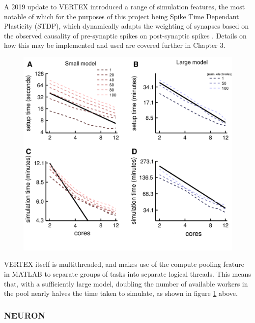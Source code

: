 A 2019 update to VERTEX introduced a range of simulation features, the most
notable of which for the purposes of this project being Spike Time Dependant
Plasticity (STDP), which dynamically adapts the weighting of synapses based on
the observed causality of pre-synaptic spikes on post-synaptic spikes
\autocite{thornton_virtual_2019}. Details on how this may be implemented and
used are covered further in Chapter 3.

\begin{figure}[h]
    \centering
    \includegraphics{figures/graphs/coresVERTEX.png}
     {\cite{tomsett_virtual_2015}}
    \label{VERTEXparallel}
\end{figure}
\vspace{1ex}

VERTEX itself is multithreaded, and makes use of the compute pooling feature in
MATLAB to separate groups of tasks into separate logical threads. This means
that, with a sufficiently large model, doubling the number of available workers
in the pool nearly halves the time taken to simulate, as shown in figure
\ref{VERTEXparallel} above.

\subsubsection{NEURON}

